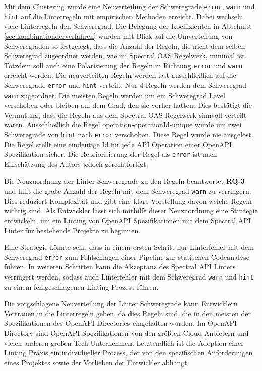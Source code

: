 Mit dem Clustering wurde eine Neuverteilung der Schweregrade \texttt{error}, \texttt{warn} und \texttt{hint} auf die Linterregeln mit empirischen Methoden erreicht. Dabei wechseln viele Linterregeln den Schweregrad. Die Belegung der Koeffizienten in Abschnitt \ref{sec:kombinationderverfahren} wurden mit Blick auf die Umverteilung von Schweregraden so festgelegt, dass die Anzahl der Regeln, die nicht dem selben Schweregrad zugeordnet werden, wie im Spectral \acs{OAS} Regelwerk, minimal ist. Totzdem soll auch eine Polarisierung der Regeln in Richtung \texttt{error} und \texttt{warn} erreicht werden. Die neuverteilten Regeln werden fast ausschließlich auf die Schweregrade \texttt{error} und \texttt{hint} verteilt. Nur 4 Regeln werden dem Schweregrad \texttt{warn} zugeordnet. Die meisten Regeln werden um ein Schweregrad Level verschoben oder bleiben auf dem Grad, den sie vorher hatten. Dies bestätigt die Vermutung, dass die Regeln aus dem Spectral \acs{OAS} Regelwerk sinnvoll verteilt waren. Ausschließlich die Regel operation-operationId-unique wurde um zwei Schweregrade von \texttt{hint} nach \texttt{error} verschoben. Diese Regel wurde nie ausgelöst. Die Regel stellt eine eindeutige Id für jede API Operation einer OpenAPI Spezifikation sicher. Die Repriorisierung der Regel als \texttt{error} ist nach Einschätzung des Autors jedoch gerechtfertigt.

Die Neuzuordnung der Linter Schweregrade zu den Regeln beantwortet \textbf{RQ-3} und hilft die große Anzahl der Regeln mit dem Schweregrad \texttt{warn} zu verringern. Dies reduziert Komplexität und gibt eine klare Vorstellung davon welche Regeln wichtig sind. Als Entwickler lässt sich mithilfe dieser Neuzuordnung eine Strategie entwickeln, um ein Linting von OpenAPI Spezifikationen mit dem Spectral API Linter für bestehende Projekte zu beginnen. 

Eine Strategie könnte sein, dass in einem ersten Schritt nur Linterfehler mit dem Schweregrad \texttt{error} zum Fehlschlagen einer Pipeline zur statischen Codeanalyse führen. In weiteren Schritten kann die Akzeptanz des Spectral \acs{API} Linters verringert werden, sodass auch Linterfehler mit dem Schweregrad \texttt{warn} und \texttt {hint} zu einem fehlgeschlagenen Linting Prozess führen. 

Die vorgschlagene Neuverteilung der Linter Schweregrade kann Entwicklern Vertrauen in die Linterregeln geben, da dies Regeln sind, die in den meisten der Spezifikationen des OpenAPI Directories eingehalten wurden. Im OpenAPI Directory sind OpenAPI Spezifikationen von den größten Cloud Anbietern und vielen anderen großen Tech Unternehmen. Letztendlich ist die Adoption einer Linting Praxis ein individueller Prozess, der von den spezifischen Anforderungen eines Projektes sowie der Vorlieben der Entwickler abhängt.

